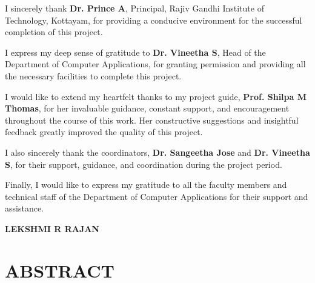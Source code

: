 \documentclass[12pt]{report}
\begin{document}
\par I sincerely thank \textbf{Dr. Prince A}, Principal, Rajiv Gandhi Institute of Technology, Kottayam, for providing a conducive environment for the successful completion of this project.

\par I express my deep sense of gratitude to \textbf{Dr. Vineetha S}, Head of the Department of Computer Applications, for granting permission and providing all the necessary facilities to complete this project.

\par I would like to extend my heartfelt thanks to my project guide, \textbf{Prof. Shilpa M Thomas}, for her invaluable guidance, constant support, and encouragement throughout the course of this work. Her constructive suggestions and insightful feedback greatly improved the quality of this project.

\par I also sincerely thank the coordinators, \textbf{Dr. Sangeetha Jose} and \textbf{Dr. Vineetha S}, for their support, guidance, and coordination during the project period.

\par Finally, I would like to express my gratitude to all the faculty members and technical staff of the Department of Computer Applications for their support and assistance.



\vspace{.8in}
\hspace{3.8in}
\noindent \textbf{LEKSHMI R RAJAN}


\chapter*{ABSTRACT}
\onehalfspacing
\setlength{\parskip}{1em}
\setlength{\parindent}{0pt}
\end{document}
